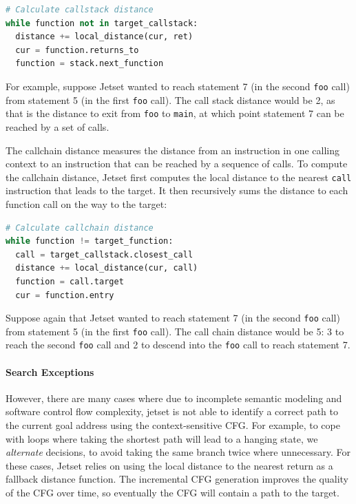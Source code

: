 \begin{lstlisting}[language=python]
# Calculate callstack distance
while function not in target_callstack:
  distance += local_distance(cur, ret)
  cur = function.returns_to
  function = stack.next_function  
\end{lstlisting}

For example, suppose Jetset wanted to reach statement 7 (in the second \texttt{foo} call) from statement 5 (in the first \texttt{foo} call).
The call stack distance would be 2, as that is the distance to exit from \texttt{foo} to \texttt{main}, at which point statement 7 can be reached by a set of calls.

The callchain distance measures the distance from an instruction in one calling context to an instruction that can be reached by a sequence of calls.
To compute the callchain distance, Jetset first computes the local distance to the nearest \texttt{call} instruction that leads to the target.
It then recursively sums the distance to each function call on the way to the target:

\begin{lstlisting}[language=python]
# Calculate callchain distance
while function != target_function:
  call = target_callstack.closest_call
  distance += local_distance(cur, call)
  function = call.target
  cur = function.entry     
\end{lstlisting}

Suppose again  that Jetset wanted to reach statement 7 (in the second \texttt{foo} call) from statement 5 (in the first \texttt{foo} call).
The call chain distance would be 5: 3 to reach the second \texttt{foo} call and 2 to descend into the \texttt{foo} call to reach statement 7.

\paragraph{Search Exceptions}
However, there are many cases where due to incomplete semantic modeling and software control flow complexity, jetset is not able to identify a correct path to the current goal address using the context-sensitive CFG.
For example, to cope with loops where taking the shortest path will lead to a hanging state, we \emph{alternate} decisions, to avoid taking the same branch twice where unnecessary.
For these cases, Jetset relies on using the local distance to the nearest return as a fallback distance function.
The incremental CFG generation improves the quality of the CFG over time, so eventually the CFG will contain a path to the target.

